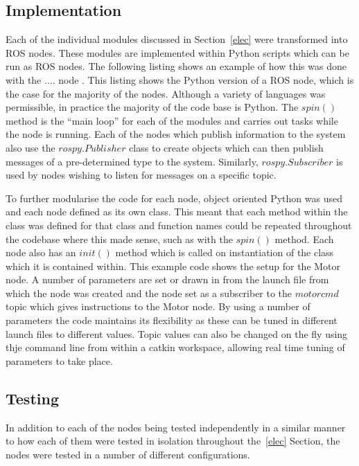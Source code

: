 \subsection{Implementation}\label{soft/ROS/impl}
Each of the individual modules discussed in Section~\ref{elec} were transformed 
into ROS nodes. These modules are implemented within Python scripts which can be 
run as ROS nodes. The following listing shows an example of how this was done 
with the .... node . This listing shows the Python 
version of a ROS node, which is the case for the majority of the nodes. Although 
a variety of languages was permissible, in practice the majority of the code base 
is Python. The $spin()$ method is the ``main loop'' for each of the modules and 
carries out tasks while the node is running. Each of the nodes which publish 
information to the system also use the $rospy.Publisher$ class to create objects 
which can then publish messages of a pre-determined type to the system. 
Similarly, $rospy.Subscriber$ is used by nodes wishing to listen for messages on 
a specific topic. 

To further modularise the code for each node, object oriented Python was used and 
each node defined as its own class. This meant that each method within the class 
was defined for that class and function names could be repeated throughout the 
codebase where this made sense, such as with the $spin()$ method. Each node also 
has an $init()$ method which is called on instantiation of the class which it 
is contained within. This  example code shows the setup 
for the Motor node. A number of parameters are set or drawn in from the launch 
file from which the node was created and the node set as a subscriber to the 
$motor cmd$ topic which gives instructions to the Motor node. By using a number of parameters the code maintains its flexibility as these can be tuned in different launch files to different values. Topic values can also be changed on the fly using thje command line from within a catkin workspace, allowing real time tuning of parameters to take place. 


\subsection{Testing}\label{soft/ROS/test}
In addition to each of the nodes being tested independently in a similar manner to how each of them were tested in isolation throughout the~\ref{elec} Section, the nodes were tested in a number of different configurations.  

